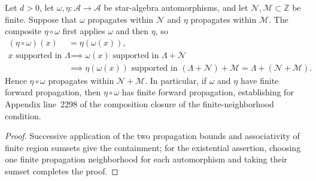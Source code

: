 \begin{lemma}
    \label{lem:qca_forward_propagation_comp}
    \leanok
    Let $d>0$, let $\omega,\eta\colon\mathcal A\to\mathcal A$ be star-algebra
    automorphisms, and let $\mathcal N,\mathcal M\subset\mathbb Z$ be finite.
    Suppose that $\omega$ propagates within $\mathcal N$ and $\eta$ propagates
    within $\mathcal M$.  The composite $\eta\circ\omega$ first applies
    $\omega$ and then $\eta$, so
    \begin{align}
        (\eta\circ\omega)(x) & =\eta(\omega(x)),                                         \\
        x\text{ supported in }\Lambda
                             & \implies \omega(x)\text{ supported in }\Lambda+\mathcal N \\
                             & \implies \eta(\omega(x))\text{ supported in }
        (\Lambda+\mathcal N)+\mathcal M
        =\Lambda+(\mathcal N+\mathcal M).
    \end{align}
    Hence $\eta\circ\omega$ propagates within $\mathcal N+\mathcal M$.
    In particular, if $\omega$ and $\eta$ have finite forward propagation, then
    $\eta\circ\omega$ has finite forward propagation, establishing for Appendix line~2298 of \cite{Cirac2017MPU} the composition
    closure of the finite-neighborhood
    condition.
\end{lemma}

\begin{proof}\leanok
    Successive application of the two propagation bounds and associativity of finite
    region sumsets give the containment; for the existential assertion, choosing one finite propagation
    neighborhood for each automorphism and taking their sumset completes the proof.
\end{proof}


